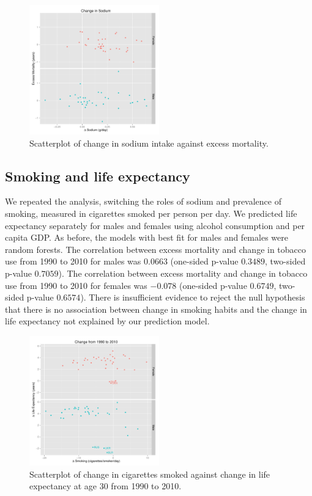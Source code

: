 \documentclass{article}
\begin{document}
\begin{figure}
\centering
\includegraphics[width = 0.5\textwidth]{sodium_exmort.pdf}
\caption{Scatterplot of change in sodium intake against excess mortality.}\label{fig:sodium_excessmortality}
\end{figure}


\clearpage
\subsection{Smoking and life expectancy}
We repeated the analysis, switching the roles of sodium and prevalence of smoking, measured in cigarettes smoked per person per day.  We predicted life expectancy separately for males and females using alcohol consumption and per capita GDP.  As before, the models with best fit for males and females were random forests.  The correlation between excess mortality and change in tobacco use from 1990 to 2010 for males was $0.0663$ (one-sided p-value $0.3489$, two-sided p-value $0.7059$).  The correlation between excess mortality and change in tobacco use from 1990 to 2010 for females was $-0.078$ (one-sided p-value $0.6749$, two-sided p-value $0.6574$).  There is insufficient evidence to reject the null hypothesis that there is no association between change in smoking habits and the change in life expectancy not explained by our prediction model.


\begin{figure}
\centering
\includegraphics[width = 0.5\textwidth]{smoking_lifeexp.pdf}
\caption{Scatterplot of change in cigarettes smoked against change in life expectancy at age 30 from 1990 to 2010.}\label{fig:smoking_lifeexp}
\end{figure}
\end{document}
